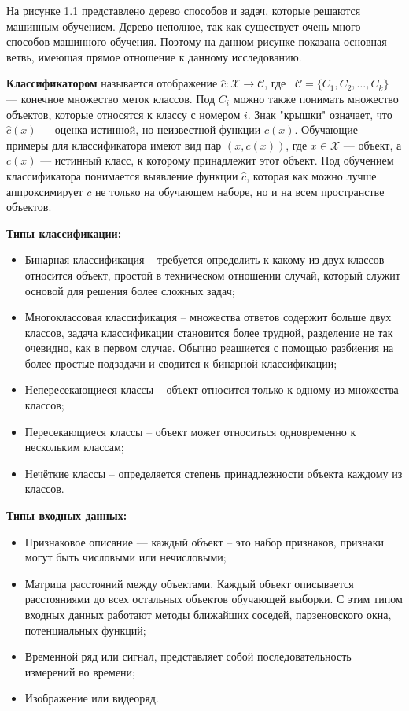На рисунке 1.1 представлено дерево способов и задач, которые решаются машинным обучением. Дерево неполное, так как существует очень много способов машинного обучения. Поэтому на данном рисунке показана основная ветвь, имеющая прямое отношение к данному исследованию.

\textbf{Классификатором} называется отображение $\widehat{c}: \mathcal{X} \to \mathcal{C}$, где 
\
$\mathcal{C} = \{C_{1}, C_{2}, \dots, C_{k}\}$ — конечное множество меток классов. Под $C_{i}$ можно также понимать множество объектов, которые относятся к классу с номером $i$. Знак "крышки" означает, что $\widehat{c}(x)$ — оценка истинной, но неизвестной функции $c(x)$. Обучающие примеры для классификатора имеют вид пар $(x,c(x))$, где $x \in \mathcal{X}$ — объект, а $c(x)$ — истинный класс, к которому принадлежит этот объект. Под обучением классификатора понимается выявление функции $\widehat{c}$, которая как можно лучше аппроксимирует $c$ не только на обучающем наборе, но и на всем пространстве объектов.\cite{MLFLACH}

\textbf{Типы классификации:}
\begin{itemize}
  \item Бинарная классификация – требуется определить к какому из двух классов относится объект, простой в техническом отношении случай, который служит основой для решения более сложных задач;
  \item Многоклассовая классификация – множества ответов содержит больше двух классов, задача классификации становится более трудной, разделение не так очевидно, как в первом случае. Обычно реашиется с помощью разбиения на более простые подзадачи и сводится к бинарной классификации;
  \item Непересекающиеся классы – объект относится только к одному из множества классов;
  \item Пересекающиеся классы – объект может относиться одновременно к нескольким классам;
  \item Нечёткие классы – определяется степень принадлежности объекта каждому из классов.
\end{itemize}

\textbf{Типы входных данных:}
\begin{itemize}
  \item Признаковое описание — каждый объект – это набор признаков, признаки могут быть числовыми или нечисловыми;
  \item Матрица расстояний между объектами. Каждый объект описывается расстояниями до всех остальных объектов обучающей выборки. С этим типом входных данных работают методы ближайших соседей, парзеновского окна, потенциальных функций;
  \item Временной ряд или сигнал, представляет собой последовательность измерений во времени;
  \item Изображение или видеоряд.
\end{itemize}

